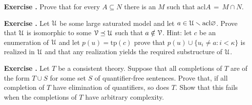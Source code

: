 \documentclass[10pt]{article}
\def\U{\EuScript U}
\def\V{\EuScript V}
\def\sm{\smallsetminus}
\def\0{\varnothing}
\def\acl{\textrm{acl}}
\def\tp{\textrm{tp}}
\newcounter{ex}
\newenvironment{exercise}{\bigskip\addtocounter{ex}{1}\textbf{Exercise \theex.\quad}}{}
\begin{document}
\begin{exercise}
Prove that for every $A\subseteq N$ there is an $M$ such that $\acl A\,=\,M\cap N$.
\end{exercise}


\begin{exercise}
Let $\U$ be some large saturated model and let $a\in\U\sm\acl\0$. Prove that $\U$ is isomorphic to some $\V\preceq \U$ such that $a\notin\V$. Hint: let $c$ be an enumeration of $\U$ and let $p(u)=\tp(c)$ prove that $p(u)\cup\big\{u_i\neq a :i<\kappa\big\}$ is realized in $\U$ and that any realization yields the required substructure of $\U$.
\end{exercise}



\begin{exercise}
Let $T$ be a consistent theory. Suppose that all completions of $T$ are of the form 
$T\cup S$ for some set $S$ of quantifier-free sentences. Prove that, if all completion of $T$ have elimination of quantifiers, so does $T$. Show that this fails when the completions of $T$ have arbitrary complexity.
\end{exercise}
\end{document}
